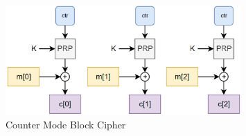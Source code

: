 \begin{figure}[h]
    \centering
    \includegraphics[width=0.8\textwidth]{image/blkctr.png}
    \caption{Counter Mode Block Cipher}
    \label{fig:ctrmode}
\end{figure}

